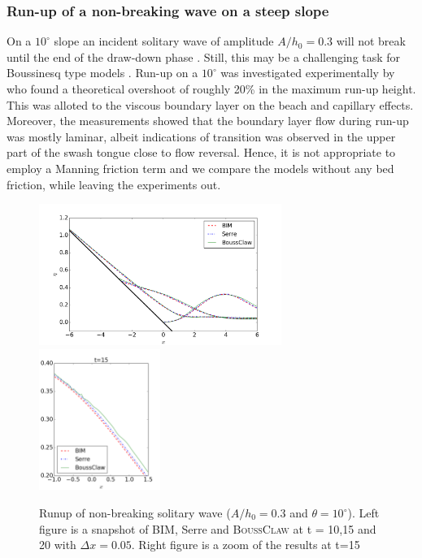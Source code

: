 \documentclass[review]{elsarticle}
\newcommand{\BoussClaw}{\textsc{BoussClaw} }
\begin{document}
\subsubsection{Run-up of a non-breaking wave on a steep slope}
\label{sec:10degrunup}
On a $10^\circ$ slope an incident solitary wave of amplitude $A/h_0=0.3$ will not break until the end of the draw-down phase \citep{Grilli:1997}.
Still, this may be a challenging task for Boussinesq type models \citep{Lovholt:2013a}. Run-up on a $10^\circ$ was investigated experimentally
by \citet{Pedersen:2013} who found a theoretical overshoot of roughly 20\% in the maximum run-up height. This was alloted to the viscous boundary layer on the beach and capillary effects. Moreover, the measurements showed that the boundary layer flow during run-up was mostly laminar, albeit indications of transition was observed in the upper part of the swash tongue close to flow reversal. Hence, it is not appropriate to employ a Manning friction term and we compare the models without any bed friction, while leaving the experiments out. 

\begin{figure}[!htb]
\centering
\includegraphics[height=4.6cm]{_fig/bim_serre_boussclaw_slope10}
\includegraphics[height=4.6cm]{_fig/bim_serre_boussclaw_slope10_zoom}
\caption{Runup of non-breaking solitary wave ($A/h_0=0.3$ and $\theta=10^\circ$). Left figure is a snapshot of BIM, Serre and \BoussClaw at
	t = 10,15 and 20 with $\Delta x=0.05$. Right figure is a zoom of the results at t=15}
\label{fig:bim_serre_boussclaw_slope10}
\end{figure}
\end{document}
